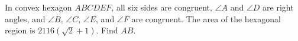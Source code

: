In convex hexagon $ABCDEF$, all six sides are congruent, $\angle A$ and $\angle D$ are right angles, and $\angle B$, $\angle C$, $\angle E$, and $\angle F$ are congruent. The area of the hexagonal region is $2116(\sqrt{2}+1)$. Find $AB$.